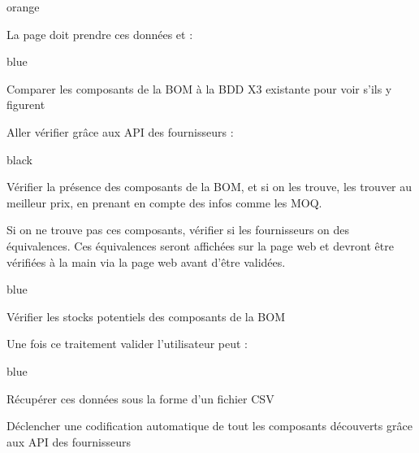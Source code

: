 {\begin{items}{orange}{\Bullet}
\item La page doit prendre ces données et :
\begin{items}{blue}{\Triangle}
\item Comparer les composants de la BOM à la BDD X3 existante pour voir s’ils y figurent
\item Aller vérifier grâce aux API des fournisseurs :
\begin{items}{black}{\Triangle}
\item Vérifier la présence des composants de la BOM, et si on les trouve, les trouver au meilleur prix, en prenant en compte des infos comme les MOQ.
\item Si on ne trouve pas ces composants, vérifier si les fournisseurs on des équivalences. Ces équivalences seront affichées sur la page web et devront être vérifiées à la main via la page web avant d’être validées.
\end{items}
\end{items}
\begin{items}{blue}{\Triangle}
\item Vérifier les stocks potentiels des composants de la BOM
\end{items}
\item Une fois ce traitement valider l’utilisateur peut :
\begin{items}{blue}{\Triangle}
\item Récupérer ces données sous la forme d’un fichier CSV
\item Déclencher une codification automatique de tout les composants découverts grâce aux API des fournisseurs
\end{items}
\end{items}

}
